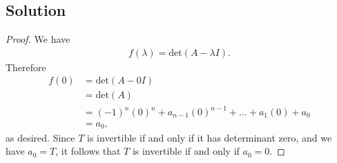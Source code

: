 \documentclass[10pt,a4paper]{article}
\theoremstyle{definition}
\begin{document}
\subsection*{Solution}
\begin{proof}
We have
\begin{align*}
f(\lambda) = \text{det} (A - \lambda I).
\end{align*}
Therefore
\begin{align*}
f(0) &= \text{det} (A - 0I)\\
&= \text{det} (A)\\
&= (-1)^n (0)^n + a_{n-1} (0)^{n-1} + \dots + a_1 (0) + a_0\\
&= a_0,
\end{align*}
as desired. Since $T$ is invertible if and only if it has determinant zero, and we have $a_0 = T$, it follows that $T$ is invertible if and only if $a_0 = 0$.
\end{proof}
\end{document}
